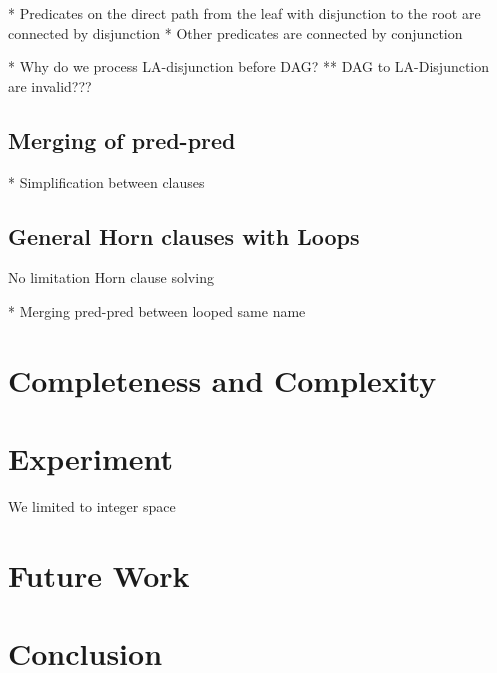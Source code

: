 \documentclass{llncs}
\begin{document}
* Predicates on the direct path from the leaf with disjunction to the
root are connected by disjunction
* Other predicates are connected by conjunction


* Why do we process LA-disjunction before DAG?
** DAG to LA-Disjunction are invalid???


\subsection{Merging of pred-pred}

* Simplification between clauses


\subsection{General Horn clauses with Loops}

No limitation Horn clause solving

* Merging pred-pred between looped same name


\section{Completeness and Complexity}


\section{Experiment}

We limited to integer space

\section{Future Work}
\section{Conclusion}



\end{document}
